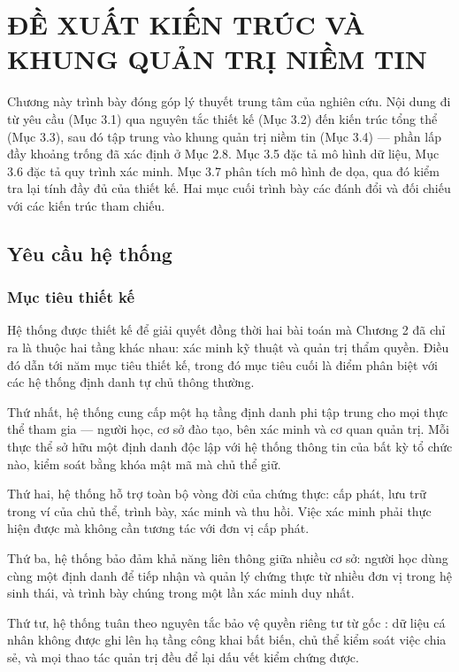 \chapter{ĐỀ XUẤT KIẾN TRÚC VÀ KHUNG QUẢN TRỊ NIỀM TIN}

Chương này trình bày đóng góp lý thuyết trung tâm của nghiên cứu. Nội dung đi từ yêu cầu (Mục 3.1) qua nguyên tắc thiết kế (Mục 3.2) đến kiến trúc tổng thể (Mục 3.3), sau đó tập trung vào khung quản trị niềm tin (Mục 3.4) --- phần lấp đầy khoảng trống đã xác định ở Mục 2.8. Mục 3.5 đặc tả mô hình dữ liệu, Mục 3.6 đặc tả quy trình xác minh. Mục 3.7 phân tích mô hình đe dọa, qua đó kiểm tra lại tính đầy đủ của thiết kế. Hai mục cuối trình bày các đánh đổi và đối chiếu với các kiến trúc tham chiếu.

\section{Yêu cầu hệ thống}

\subsection{Mục tiêu thiết kế}

Hệ thống được thiết kế để giải quyết đồng thời hai bài toán mà Chương 2 đã chỉ ra là thuộc hai tầng khác nhau: xác minh kỹ thuật và quản trị thẩm quyền. Điều đó dẫn tới năm mục tiêu thiết kế, trong đó mục tiêu cuối là điểm phân biệt với các hệ thống định danh tự chủ thông thường.

Thứ nhất, hệ thống cung cấp một hạ tầng định danh phi tập trung cho mọi thực thể tham gia --- người học, cơ sở đào tạo, bên xác minh và cơ quan quản trị. Mỗi thực thể sở hữu một định danh độc lập với hệ thống thông tin của bất kỳ tổ chức nào, kiểm soát bằng khóa mật mã mà chủ thể giữ.

Thứ hai, hệ thống hỗ trợ toàn bộ vòng đời của chứng thực: cấp phát, lưu trữ trong ví của chủ thể, trình bày, xác minh và thu hồi. Việc xác minh phải thực hiện được mà không cần tương tác với đơn vị cấp phát.

Thứ ba, hệ thống bảo đảm khả năng liên thông giữa nhiều cơ sở: người học dùng cùng một định danh để tiếp nhận và quản lý chứng thực từ nhiều đơn vị trong hệ sinh thái, và trình bày chúng trong một lần xác minh duy nhất.

Thứ tư, hệ thống tuân theo nguyên tắc bảo vệ quyền riêng tư từ gốc \cite{Cavoukian2009}: dữ liệu cá nhân không được ghi lên hạ tầng công khai bất biến, chủ thể kiểm soát việc chia sẻ, và mọi thao tác quản trị đều để lại dấu vết kiểm chứng được.

